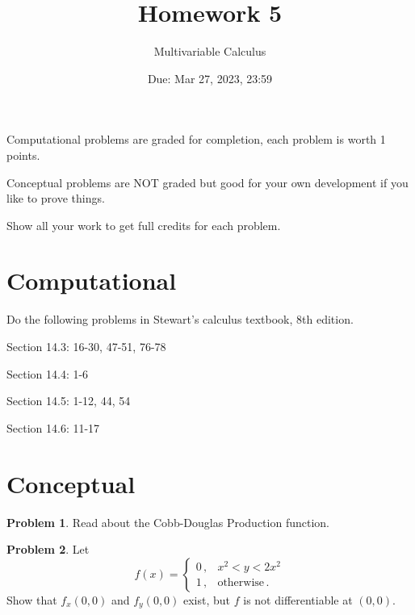 \documentclass[12pt]{article}
\title{Homework 5}
\author{ Multivariable Calculus}
\date{Due: Mar 27, 2023, 23:59}
\theoremstyle{definition}
\newtheorem{problem}{Problem}
\begin{document}
\maketitle

Computational problems are graded for completion, each problem is worth 1 points.

Conceptual problems are NOT graded but good for your own development if you like to prove things.

Show all your work to get full credits for each problem.
\section{Computational}
Do the following problems in Stewart's calculus textbook, 8th edition.

Section 14.3: 16-30, 47-51, 76-78

Section 14.4: 1-6 

Section 14.5: 1-12, 44, 54

Section 14.6: 11-17



\section{Conceptual}

\begin{problem}
    Read about the Cobb-Douglas Production function.
\end{problem}

\begin{problem}
    Let
    \begin{equation*}
        f(x) = 
        \begin{cases}
            0 \,, & x^2 < y < 2x^2 \\
            1 \,, & \text{otherwise} \,.
        \end{cases}
    \end{equation*}
    Show that $f_x(0,0)$ and $f_y(0,0)$ exist, but $f$ is not differentiable at
    $(0,0)$.
\end{problem}


%
\end{document}
